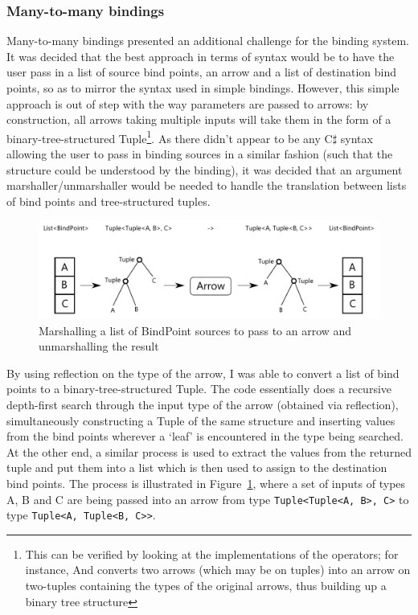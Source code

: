 \documentclass[12pt,twoside,notitlepage]{report}
\begin{document}
\subsubsection{Many-to-many bindings} \label{sec:many_many_bindings}

Many-to-many bindings presented an additional challenge for the binding system. It was decided that the best approach in terms of syntax would be to have the user pass in a list of source bind points, an arrow and a list of destination bind points, so as to mirror the syntax used in simple bindings. However, this simple approach is out of step with the way parameters are passed to arrows: by construction, all arrows taking multiple inputs will take them in the form of a binary-tree-structured Tuple\footnote{This can be verified by looking at the implementations of the operators; for instance, And converts two arrows (which may be on tuples) into an arrow on two-tuples containing the types of the original arrows, thus building up a binary tree structure}. As there didn't appear to be any C$\sharp$ syntax allowing the user to pass in binding sources in a similar fashion (such that the structure could be understood by the binding), it was decided that an argument marshaller/unmarshaller would be needed to handle the translation between lists of bind points and tree-structured tuples.

\begin{figure}[!ht]
  \centering
  \includegraphics[width=\textwidth]{fig/ArgumentMarshalling.pdf}
  \caption{Marshalling a list of BindPoint sources to pass to an arrow and unmarshalling the result}
  \label{fig:argument_marshalling}
\end{figure}

By using reflection on the type of the arrow, I was able to convert a list of bind points to a binary-tree-structured Tuple. The code essentially does a recursive depth-first search through the input type of the arrow (obtained via reflection), simultaneously constructing a Tuple of the same structure and inserting values from the bind points wherever a `leaf' is encountered in the type being searched. At the other end, a similar process is used to extract the values from the returned tuple and put them into a list which is then used to assign to the destination bind points. The process is illustrated in Figure~\ref{fig:argument_marshalling}, where a set of inputs of types A, B and C are being passed into an arrow from type \texttt{Tuple<Tuple<A, B>, C>} to type \texttt{Tuple<A, Tuple<B, C>>}.
\end{document}
